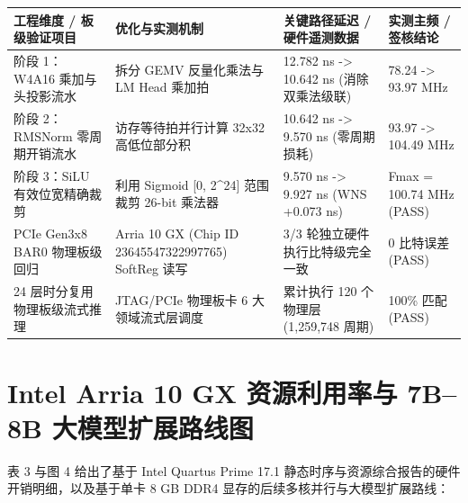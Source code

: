 \documentclass[11pt,a4paper]{article}
\begin{document}
{\footnotesize\renewcommand{\arraystretch}{1.14}\begin{longtable}{@{}L{0.23\textwidth}L{0.27\textwidth}L{0.24\textwidth}L{0.16\textwidth}@{}}\toprule

\textbf{工程维度 /\allowbreak{} 板级验证项目} & \textbf{优化与实测机制} & \textbf{关键路径延迟 /\allowbreak{} 硬件遥测数据} & \textbf{实测主频 /\allowbreak{} 签核结论}\\\midrule\endhead

阶段 1：W4A16 乘加与头投影流水 & 拆分 GEMV 反量化乘法与 LM Head 乘加拍 & 12.782 ns -> 10.642 ns (\allowbreak{}消除双乘法级联)\allowbreak{} & 78.24 -> 93.97 MHz\\[2pt]

阶段 2：RMSNorm 零周期开销流水 & 访存等待拍并行计算 32x32 高低位部分积 & 10.642 ns -> 9.570 ns (\allowbreak{}零周期损耗)\allowbreak{} & 93.97 -> 104.49 MHz\\[2pt]

阶段 3：SiLU 有效位宽精确裁剪 & 利用 Sigmoid [\allowbreak{}0,\allowbreak{} 2\textasciicircum{}24]\allowbreak{} 范围裁剪 26-bit 乘法器 & 9.570 ns -> 9.927 ns (\allowbreak{}WNS +\allowbreak{}0.073 ns)\allowbreak{} & Fmax =\allowbreak{} 100.74 MHz (\allowbreak{}PASS)\allowbreak{}\\[2pt]

PCIe Gen3x8 BAR0 物理板级回归 & Arria 10 GX (\allowbreak{}Chip ID 23645547\allowbreak{}32299776\allowbreak{}5)\allowbreak{} SoftReg 读写 & 3/\allowbreak{}3 轮独立硬件执行比特级完全一致 & 0 比特误差 (\allowbreak{}PASS)\allowbreak{}\\[2pt]

24 层时分复用物理板级流式推理 & JTAG/\allowbreak{}PCIe 物理板卡 6 大领域流式层调度 & 累计执行 120 个物理层 (\allowbreak{}1,\allowbreak{}259,\allowbreak{}748 周期)\allowbreak{} & 100\% 匹配 (\allowbreak{}PASS)\allowbreak{}\\[2pt]

\bottomrule\end{longtable}}

\section{Intel Arria 10 GX 资源利用率与 7B–8B 大模型扩展路线图}

表 3 与图 4 给出了基于 Intel Quartus Prime 17.1 静态时序与资源综合报告的硬件开销明细，以及基于单卡 8 GB DDR4 显存的后续多核并行与大模型扩展路线：
\end{document}
